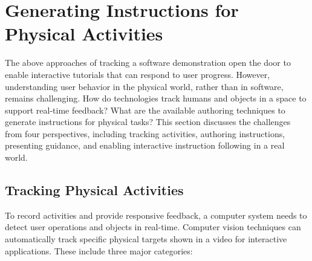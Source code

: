 


\section{Generating Instructions for Physical Activities}
\label{related_physical}

The above approaches of tracking a software demonstration open the door to enable interactive tutorials that can respond to user progress. However, understanding user behavior in the physical world, rather than in software, remains challenging.
%
How do technologies track humans and objects in a space to support real-time feedback? What are the available authoring techniques to generate instructions for physical tasks?
%
This section discusses the challenges from four perspectives, including tracking activities, authoring instructions, presenting guidance, and enabling interactive instruction following in a real world.


\subsection{Tracking Physical Activities}
To record activities and provide responsive feedback, a computer system needs to detect user operations and objects in real-time.
%
Computer vision techniques can automatically track specific physical targets shown in a video for interactive applications. These include three major categories:

